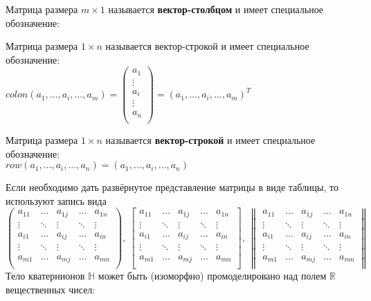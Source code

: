 \documentclass{article}
\begin{document}
Матрица размера $m \times 1$ называется {\bf вектор-столбцом} и имеет специальное
обозначение:


Матрица размера $1 \times n$ называется вектор-строкой и имеет специальное
обозначение:
\\
$colon(a_1, \ldots, a_i, \ldots, a_m) = 
\left(\begin{matrix}
a_1 \\
\vdots \\
a_i \\
\vdots \\
a_n \\
\end{matrix}\right)
= (a_1, \ldots, a_i, \ldots, a_m)^T
$
\newpage
\par Матрица размера $1 \times n$ называется {\bf вектор-строкой} и имеет специальное
обозначение: 
\\
$ row(a_1, \ldots, a_i, \ldots, a_n) = (a_1, \ldots, a_i, \ldots, a_n)$
\\
\par Если необходимо дать развёрнутое представление матрицы в виде таблицы,
то используют запись вида
\\
$
\begin{pmatrix}
a_{11} & \ldots  & a_{1j} & \ldots & a_{1n} \\
\vdots & \ddots & \vdots & \ddots & \vdots \\
a_{i1} & \ldots  & a_{ij} & \ldots & a_{in} \\
\vdots & \ddots & \vdots & \ddots & \vdots \\
a_{m1} & \ldots  & a_{mj} & \ldots & a_{mn} \\
\end{pmatrix},~
\begin{bmatrix}
a_{11} & \ldots  & a_{1j} & \ldots & a_{1n} \\
\vdots & \ddots & \vdots & \ddots & \vdots \\
a_{i1} & \ldots  & a_{ij} & \ldots & a_{in} \\
\vdots & \ddots & \vdots & \ddots & \vdots \\
a_{m1} & \ldots  & a_{mj} & \ldots & a_{mn} \\
\end{bmatrix},~
\begin{Vmatrix}
a_{11} & \ldots  & a_{1j} & \ldots & a_{1n} \\
\vdots & \ddots & \vdots & \ddots & \vdots \\
a_{i1} & \ldots  & a_{ij} & \ldots & a_{in} \\
\vdots & \ddots & \vdots & \ddots & \vdots \\
a_{m1} & \ldots  & a_{mj} & \ldots & a_{mn} \\
\end{Vmatrix}
$
Тело кватернионов $\mathbb{H}$ может быть (изоморфно) промоделировано над полем $\mathbb{R}$
вещественных чисел:
\\
\end{document}
